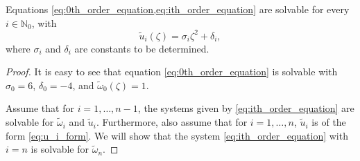 \begin{theorem}
  \label{thm:i_order_solution}
  Equations \cref{eq:0th_order_equation,eq:ith_order_equation} are
  solvable for every $i\in\mathbb N_{0}$, with
  \begin{equation}
    \label{eq:u_i_form}
    \tilde u_i(\zeta) = \sigma_i \zeta^2 + \delta_i,
  \end{equation}
	where $\sigma_i$ and $\delta_i$ are constants to be determined.
\end{theorem}
\begin{proof}
It is easy to see that equation \cref{eq:0th_order_equation} is solvable with
$\sigma_0=6$, $\delta_0=-4$, and $\tilde\omega_0(\zeta) = 1$.

Assume that for $i=1,\dots,n-1$, the systems given by
\cref{eq:ith_order_equation} are solvable for $\tilde\omega_i$ and $\tilde u_i$.
Furthermore, also assume that for $i=1,\dots,n$, $\tilde u_i$ is of the form
\cref{eq:u_i_form}.  We will show that the system \cref{eq:ith_order_equation}
with $i=n$ is solvable for $\tilde \omega_n$.


\end{proof}
